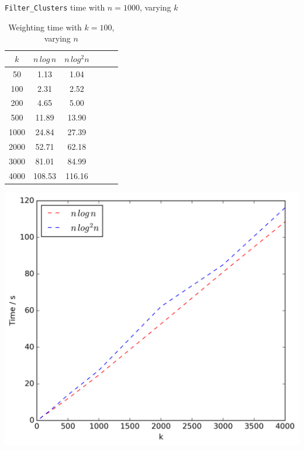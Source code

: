 \documentclass[12pt,a4paper]{article}
\begin{document}
\begin{table}[!ht]
        \begin{minipage}{0.48\textwidth}
            \centering
            \caption[Runtime of \texttt{Filter\_Clusters} in Scenario 1, with $n = 1000$ and varying $k$]{\texttt{Filter\_Clusters} time with $n = 1000$, varying $k$}
            \label{tab:filterk1}
            \begin{tabular}{c||ccccc}
                $k$ & $n\,log\,n$ & $n\,log^2n$\\
                \hline\hline
                50 & 1.13 & 1.04\\
                100 & 2.31 & 2.52\\
                200 & 4.65 & 5.00\\
                500 & 11.89 & 13.90\\
                1000 & 24.84 & 27.39\\
                2000 & 52.71 & 62.18\\
                3000 & 81.01 & 84.99\\
                4000 & 108.53 & 116.16\\
            \end{tabular}
            \includegraphics[scale=0.4]{varyingk1_filter}
            \vspace{0.5cm}
        \end{minipage}
        \begin{minipage}{0.48\textwidth}
            \centering
            \caption[Runtime of the Weighting step in Scenario 1, with $k = 100$ and varying $n$]{Weighting time with $k = 100$, varying $n$}

\end{minipage}
\end{table}
\end{document}
